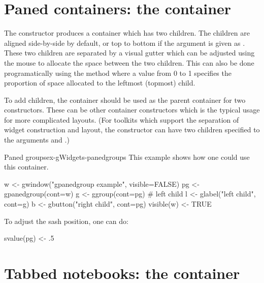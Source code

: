 \section{Paned containers: the  container}
\label{sec:gWidgets-gpanedgroup-container}

The  constructor produces a container which
has two children. The children are aligned side-by-side by default, or
top to bottom if the  argument is given as . These two
children are separated by a visual gutter which can be adjusted using
the mouse to allocate the space between the two children. This can
also be done programatically using the 
method where  a value from 0 to 1 specifies the proportion of space allocated to the leftmost (topmost) child.

To add children, the container should be used as the parent container
for two constructors. These can be other container constructors which
is the typical usage for more complicated layouts.
(For toolkits which support the separation of widget
construction and layout, the  constructor can
have two children specified to the arguments
 and .)

\begin{example}{Paned groups}{ex-gWidgets-panedgroups}
  This example shows how one could use this container.
\begin{Schunk}
\begin{Sinput}
 w <- gwindow("gpanedgroup example", visible=FALSE)
 pg <- gpanedgroup(cont=w)
 g <- ggroup(cont=pg)                  # left child
 l <- glabel("left child", cont=g)
 b <- gbutton("right child", cont=pg)
 visible(w) <- TRUE
\end{Sinput}
\end{Schunk}
To adjust the sash position, one can do:
\begin{Schunk}
\begin{Sinput}
 svalue(pg) <- .5
\end{Sinput}
\end{Schunk}
\end{example}


  
\section{Tabbed notebooks: the  container}
\label{sec:gWidgets-gnotebook}

